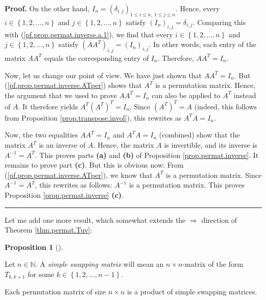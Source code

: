 \documentclass[numbers=enddot,12pt,final,onecolumn,notitlepage]{scrartcl}%
\theoremstyle{definition}
\newtheorem{prop}[theo]{Proposition}
\newenvironment{proposition}[1][]
{\begin{prop}[#1]\begin{leftbar}}
{\end{leftbar}\end{prop}}
\newenvironment{proof}[1][Proof]{\noindent\textbf{#1.} }{\ \rule{0.5em}{0.5em}}
\begin{document}
\begin{proof}
On the other hand, $I_{n}=\left(  \delta_{i,j}\right)  _{1\leq i\leq n,\ 1\leq
j\leq n}$. Hence, every $i\in\left\{  1,2,\ldots,n\right\}  $ and
$j\in\left\{  1,2,\ldots,n\right\}  $ satisfy $\left(  I_{n}\right)
_{i,j}=\delta_{i,j}$. Comparing this with (\ref{pf.prop.permat.inverse.a.1}),
we find that every $i\in\left\{  1,2,\ldots,n\right\}  $ and $j\in\left\{
1,2,\ldots,n\right\}  $ satisfy $\left(  AA^{T}\right)  _{i,j}=\left(
I_{n}\right)  _{i,j}$. In other words, each entry of the matrix $AA^{T}$
equals the corresponding entry of $I_{n}$. Therefore, $AA^{T}=I_{n}$.

Now, let us change our point of view. We have just shown that $AA^{T}=I_{n}$.
But (\ref{pf.prop.permat.inverse.ATper}) shows that $A^{T}$ is a permutation
matrix. Hence, the argument that we used to prove $AA^{T}=I_{n}$ can also be
applied to $A^{T}$ instead of $A$. It therefore yields $A^{T}\left(
A^{T}\right)  ^{T}=I_{n}$. Since $\left(  A^{T}\right)  ^{T}=A$ (indeed, this
follows from Proposition \ref{prop.transpose.invol}), this rewrites as
$A^{T}A=I_{n}$.

Now, the two equalities $AA^{T}=I_{n}$ and $A^{T}A=I_{n}$ (combined) show that
the matrix $A^{T}$ is an inverse of $A$. Hence, the matrix $A$ is invertible,
and its inverse is $A^{-1}=A^{T}$. This proves parts \textbf{(a)} and
\textbf{(b)} of Proposition \ref{prop.permat.inverse}. It remains to prove
part \textbf{(c)}. But this is obvious now: From
(\ref{pf.prop.permat.inverse.ATper}), we know that $A^{T}$ is a permutation
matrix. Since $A^{-1}=A^{T}$, this rewrites as follows: $A^{-1}$ is a
permutation matrix. This proves Proposition \ref{prop.permat.inverse}
\textbf{(c)}.
\end{proof}

Let me add one more result, which somewhat extends the $\Longrightarrow$
direction of Theorem \ref{thm.permat.Tuv}:

\begin{proposition}
\label{prop.permat.Tkk+1}Let $n\in\mathbb{N}$. A \textit{simple swapping
matrix} will mean an $n\times n$-matrix of the form $T_{k,k+1}$ for some
$k\in\left\{  1,2,\ldots,n-1\right\}  $.

Each permutation matrix of size $n\times n$ is a product of simple swapping matrices.
\end{proposition}
\end{document}
